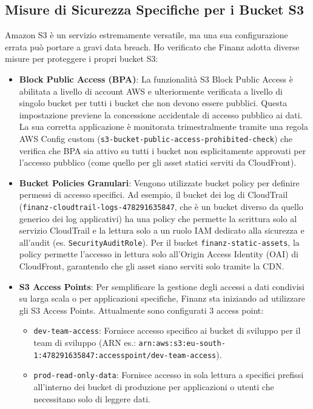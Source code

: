 \subsection{Misure di Sicurezza Specifiche per i Bucket S3}
\label{subsec:s3-security_cap2}
Amazon S3 è un servizio estremamente versatile, ma una sua configurazione errata può portare a gravi data breach. Ho verificato che Finanz adotta diverse misure per proteggere i propri bucket S3:
\begin{itemize}
    \item \textbf{Block Public Access (BPA)}: La funzionalità S3 Block Public Access è abilitata a livello di account AWS e ulteriormente verificata a livello di singolo bucket per tutti i bucket che non devono essere pubblici. Questa impostazione previene la concessione accidentale di accesso pubblico ai dati. La sua corretta applicazione è monitorata trimestralmente tramite una regola AWS Config custom (\texttt{s3-bucket-public-access-prohibited-check}) che verifica che BPA sia attivo su tutti i bucket non esplicitamente approvati per l'accesso pubblico (come quello per gli asset statici serviti da CloudFront).
    \item \textbf{Bucket Policies Granulari}: Vengono utilizzate bucket policy per definire permessi di accesso specifici. Ad esempio, il bucket dei log di CloudTrail (\texttt{finanz-cloudtrail-logs-478291635847}, che è un bucket diverso da quello generico dei log applicativi) ha una policy che permette la scrittura solo al servizio CloudTrail e la lettura solo a un ruolo IAM dedicato alla sicurezza e all'audit (es. \texttt{SecurityAuditRole}). Per il bucket \texttt{finanz-static-assets}, la policy permette l'accesso in lettura solo all'Origin Access Identity (OAI) di CloudFront, garantendo che gli asset siano serviti solo tramite la CDN.
    \item \textbf{S3 Access Points}: Per semplificare la gestione degli accessi a dati condivisi su larga scala o per applicazioni specifiche, Finanz sta iniziando ad utilizzare gli S3 Access Points. Attualmente sono configurati 3 access point:
        \begin{itemize}
            \item \texttt{dev-team-access}: Fornisce accesso specifico ai bucket di sviluppo per il team di sviluppo (ARN es.: \texttt{arn:aws:s3:eu-south-1:478291635847:accesspoint/dev-team-access}).
            \item \texttt{prod-read-only-data}: Fornisce accesso in sola lettura a specifici prefissi all'interno dei bucket di produzione per applicazioni o utenti che necessitano solo di leggere dati.

\end{itemize}
\end{itemize}
